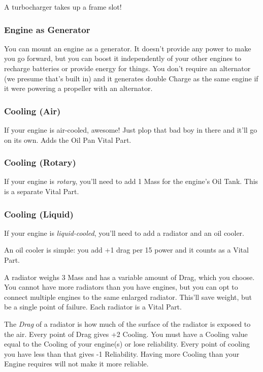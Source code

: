 \documentclass{article}
\begin{document}
A turbocharger takes up a frame slot!

\subsubsection{Engine as Generator}
\label{Engine_as_Generator}

You can mount an engine as a generator. It doesn't provide any power to
make you go forward, but you can boost it independently of your other
engines to recharge batteries or provide energy for things. You don't
require an alternator (we presume that's built in) and it generates
double Charge as the same engine if it were powering a propeller with an
alternator.

\subsubsection{Cooling (Air)}
\label{_Cooling_(Air)}

If your engine is air-cooled, awesome! Just plop that bad boy in there
and it'll go on its own. Adds the Oil Pan Vital Part.

\subsubsection{Cooling (Rotary)}
\label{_Cooling_(Rotary)}

If your engine is \emph{rotary}, you'll need to add 1 Mass for the
engine's Oil Tank. This is a separate Vital Part.

\subsubsection{Cooling (Liquid)}
\label{_Cooling_(Liquid)}

If your engine is \emph{liquid-cooled}, you'll need to add a radiator
and an oil cooler.

An oil cooler is simple: you add +1 drag per 15 power and it counts as a
Vital Part.

A radiator weighs 3 Mass and has a variable amount of Drag, which you
choose. You cannot have more radiators than you have engines, but you
can opt to connect multiple engines to the same enlarged radiator.
This'll save weight, but be a single point of failure. Each radiator is
a Vital Part.

The \emph{Drag }of a radiator is how much of the surface of the radiator
is exposed to the air. Every point of Drag gives +2 Cooling. You must
have a Cooling value equal to the Cooling of your engine(s) or lose
reliability. Every point of cooling you have less than that gives -1
Reliability. Having more Cooling than your Engine requires will not make
it more reliable.
\end{document}
